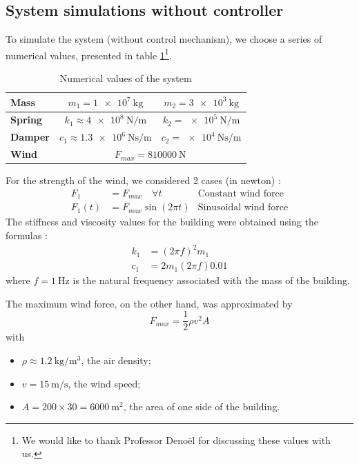 \subsection{System simulations without controller}
To simulate the system (without control mechanism), we choose a series of numerical values, presented in table \ref{tab:numerical_values}\footnote{We would like to thank Professor Denoël for discussing these values with us.}.
\begin{table}[H]
    \centering
    \begin{tabular}{|l|c|c|}
        \hline
        {\bf Mass} & $m_1 = \SI{1e7}{\kilogram}$ & $m_2 = \SI{3e3}{\kilogram}$\\ \hline
        {\bf Spring} & $k_1 \approx \SI{4e8}{\newton/\meter}$ & $k_2 = \SI{e5}{\newton/\meter}$\\ \hline
        {\bf Damper} & $c_1 \approx \SI{1.3e6}{\newton\second/\meter}$ & $c_2 = \SI{e4}{\newton\second/\meter}$\\ \hline
        {\bf Wind} & \multicolumn{2}{c|}{$F_{max} = \SI{810000}{\newton}$}\\ \hline
    \end{tabular}
    \caption{Numerical values of the system}
    \label{tab:numerical_values}
\end{table}
For the strength of the wind, we considered 2 cases (in newton) :
\begin{align*}
    F_1 &= F_{max}\quad\forall t & \text{Constant wind force}\\
    F_1(t) &= F_{max}\sin(2\pi t) & \text{Sinusoidal wind force}
\end{align*}
The stiffness and viscosity values for the building were obtained using the formulas :
\begin{align*}
    k_1 &= (2\pi f)^2m_1\\
    c_1 &= 2m_1(2\pi f)0.01
\end{align*}
where $f = \SI{1}{\hertz}$ is the natural frequency associated with the mass of the building.\par
The maximum wind force, on the other hand, was approximated by
\begin{equation*}
    F_{max} = \frac{1}{2}\rho v^2A
\end{equation*}
with
\begin{itemize}
    \item $\rho \approx \SI{1.2}{\kilogram/\meter\cubed}$, the air density;
    \item $v = \SI{15}{\meter/\second}$, the wind speed;
    \item $A = 200\times 30 = \SI{6000}{\meter\squared}$, the area of one side of the building.
\end{itemize}
